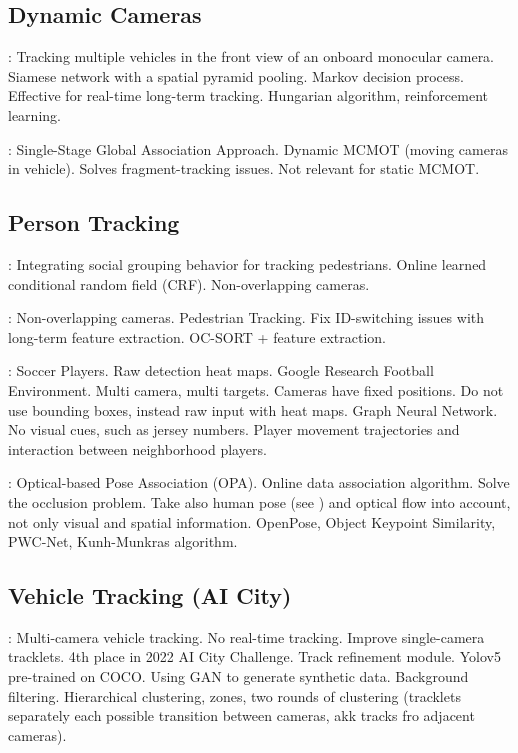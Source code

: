 \subsection{Dynamic Cameras}

\cite{Zou19}: Tracking multiple vehicles in the front view of an onboard monocular camera. Siamese network with a spatial pyramid pooling. Markov decision process. Effective for real-time long-term tracking. Hungarian algorithm, reinforcement learning.

\cite{Nguyen22b}: Single-Stage Global Association Approach. Dynamic MCMOT (moving cameras in vehicle). Solves fragment-tracking issues. Not relevant for static MCMOT.

\subsection{Person Tracking}

\cite{Chen17b}: Integrating social grouping behavior for tracking pedestrians. Online learned conditional random field (CRF). Non-overlapping cameras.

\cite{Huang23a}: Non-overlapping cameras. Pedestrian Tracking. Fix ID-switching issues with long-term feature extraction. OC-SORT + feature extraction.

\cite{Komorowski22}: Soccer Players. Raw detection heat maps. Google Research Football Environment. Multi camera, multi targets. Cameras have fixed positions. Do not use bounding boxes, instead raw input with heat maps. Graph Neural Network. No visual cues, such as jersey numbers. Player movement trajectories and interaction between neighborhood players.

\cite{You21}: Optical-based Pose Association (OPA). Online data association algorithm. Solve the occlusion problem. Take also human pose (see \cite{Li19}) and optical flow into account, not only visual and spatial information. OpenPose, Object Keypoint Similarity, PWC-Net, Kunh-Munkras algorithm.

\subsection{Vehicle Tracking (AI City)}

\cite{Specker22}: Multi-camera vehicle tracking. No real-time tracking. Improve single-camera tracklets. 4th place in 2022 AI City Challenge. Track refinement module. Yolov5 pre-trained on COCO. Using GAN to generate synthetic data. Background filtering. Hierarchical clustering, zones, two rounds of clustering (tracklets separately each possible transition between cameras, akk tracks fro adjacent cameras).


